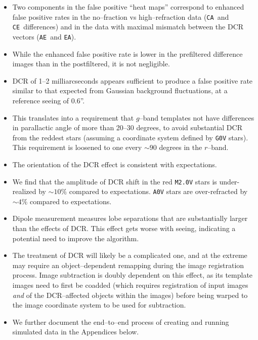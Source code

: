 \documentclass[prd, nofootinbib, floatfix, 11pt, tightenlines, times]{article}
\def\A{{\tt A}}
\def\C{{\tt C}}
\def\E{{\tt E}}
\begin{document}
\begin{itemize}
\item Two components in the false positive ``heat maps'' correspond to
  enhanced false positive rates in the no--fraction vs
  high--refraction data (\C\A\ and \C\E\ differences) and in the data
  with maximal mismatch between the DCR vectors (\A\E\ and \E\A).

\item While the enhanced false positive rate is lower in the
  prefiltered difference images than in the postfiltered, it is not
  negligible.

\item DCR of 1--2 milliarcseconds appears sufficient to produce a
  false positive rate similar to that expected from Gaussian
  background fluctuations, at a reference seeing of 0.6''.

\item This translates into a requirement that $g$--band templates not
  have differences in parallactic angle of more than 20--30 degrees,
  to avoid substantial DCR from the reddest stars (assuming a
  coordinate system defined by {\tt G0V} stars).  This requirement is
  loosened to one every $\sim 90$ degrees in the $r$--band.

\item The orientation of the DCR effect is consistent with
  expectations.

\item We find that the amplitude of DCR shift in the red {\tt M2.0V}
  stars is under-realized by $\sim 10\%$ compared to expectations.
  {\tt A0V} stars are over-refracted by $\sim 4\%$ compared to
  expectations.

\item Dipole measurement measures lobe separations that are
  substantially larger than the effects of DCR.  This effect gets
  worse with seeing, indicating a potential need to improve the
  algorithm.

\item The treatment of DCR will likely be a complicated one, and at
  the extreme may require an object--dependent remapping during the
  image registration process.  Image subtraction is doubly dependent
  on this effect, as its template images need to first be coadded
  (which requires registration of input images {\it and} of the
  DCR--affected objects within the images) before being warped to the
  image coordinate system to be used for subtraction.

\item We further document the end--to--end process of creating and
  running simulated data in the Appendices below.

\end{itemize}
\end{document}
